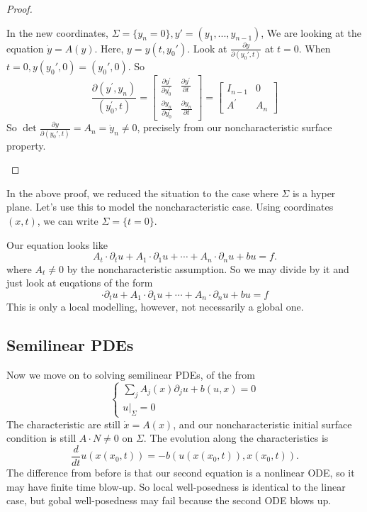 \begin{proof}
\begin{itemize}
    In the new coordinates, $\Sigma = \{y_n=0\}, y'=(y_1,...,y_{n-1})$, We are looking at the equation $\dot y = A(y)$. Here, $y=y(t,y_0')$. Look at $\frac{\partial y}{\partial (y_0',t)}$ at $t=0$. When $t=0, y(y_0', 0) = (y_0', 0)$. So 
    \[
        \frac{\partial\left(y^{\prime}, y_{n}\right)}{\left(y_{0}^{\prime}, t\right)}=\left[\begin{array}{cc}
            \frac{\partial y^{\prime}}{\partial y_{0}^{\prime}} & \frac{\partial y^{\prime}}{\partial t} \\
            \frac{\partial y_{n}}{\partial y_{0}^{\prime}} & \frac{\partial y_{n}}{\partial t}
            \end{array}\right]=\left[\begin{array}{cc}
            I_{n-1} & 0 \\
            A^{\prime} & A_{n}
            \end{array}\right]
    \]
    So $\det \frac{\partial y}{\partial (y_0',t)} = A_n = \dot{y}_n\neq 0$, precisely from our noncharacteristic surface property.

     
\end{itemize}
\end{proof}

\begin{remark}
In the above proof, we reduced the situation to the case where $\Sigma$ is a hyper plane. Let's use this to model the noncharacteristic case. Using coordinates $(x,t)$, we can write $\Sigma= \{t=0\}$.

Our equation looks like 
\[
    A_{t} \cdot \partial_{t} u+A_{1} \cdot \partial_{1} u+\cdots+A_{n} \cdot \partial_{n} u+b u=f.
\]
where $A_t \neq 0$ by the noncharacteristic assumption. So we may divide by it and just look at euqations of the form 
\[
    \cdot \partial_{t} u+A_{1} \cdot \partial_{1} u+\cdots+A_{n} \cdot \partial_{n} u+b u=f
\]
This is only a local modelling, however, not necessarily a global one.
\end{remark}

\subsection{Semilinear PDEs}
Now we move on to solving semilinear PDEs, of the from
\[
     \begin{cases}
         \sum_j A_j(x) \partial_j u + b(u,x) = 0\\
         u|_{\Sigma}=0
     \end{cases}
\]
The characteristic are still $\dot{x} = A(x)$, and our noncharacteristic initial surface condition is still $A\cdot N\neq 0$ on $\Sigma$. The evolution along the characteristics is 
\[
    \frac{d}{dt}u(x(x_0,t)) = -b(u(x(x_0,t)),x(x_0,t)).
\]
The difference from before is that our second equation is a nonlinear ODE, so it may have finite time blow-up. So local well-posedness is identical to the linear case, but gobal well-posedness may fail because the second ODE blows up.


